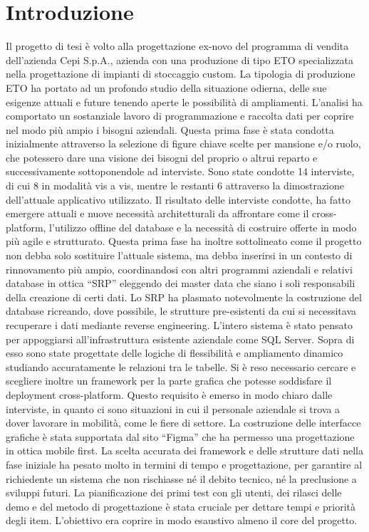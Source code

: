 \chapter{Introduzione}\label{chapter:introduction}
Il progetto di tesi è volto alla progettazione ex-novo del programma di vendita dell'azienda Cepi S.p.A.,
azienda con una produzione di tipo \ac{ETO} specializzata nella progettazione di impianti di stoccaggio custom.
La tipologia di produzione \ac{ETO} ha portato ad un profondo studio della situazione odierna, delle sue esigenze attuali
e future tenendo aperte le possibilità di ampliamenti.
L'analisi ha comportato un sostanziale lavoro di programmazione e raccolta dati per coprire nel modo più
ampio i bisogni aziendali.
Questa prima fase è stata condotta inizialmente attraverso la selezione di figure chiave scelte per mansione e/o ruolo,
che potessero
dare una visione dei bisogni del proprio o altrui reparto e successivamente sottoponendole ad interviste.
Sono state condotte 14 interviste, di cui 8 in modalità vis a vis, mentre le restanti 6 attraverso la dimostrazione
dell'attuale applicativo utilizzato.
Il risultato delle interviste condotte, ha fatto emergere attuali e nuove necessità architetturali da affrontare
come il cross-platform, l'utilizzo offline del database e la necessità di costruire offerte in modo più agile e strutturato.
Questa prima fase ha inoltre sottolineato come il progetto non debba solo sostituire l'attuale sistema,
ma debba inserirsi in un contesto di rinnovamento più ampio, coordinandosi con altri programmi aziendali e relativi database in ottica ``\ac{SRP}''
eleggendo dei master data che siano i soli responsabili della creazione di certi dati.
Lo \ac{SRP} ha plasmato notevolmente la costruzione del database ricreando, dove possibile,
le strutture pre-esistenti da cui si necessitava recuperare i dati mediante reverse engineering.
L'intero sistema è stato pensato per appoggiarsi all'infrastruttura esistente aziendale come SQL Server\cite{SQLServer}.
Sopra di esso sono state progettate delle logiche di flessibilità e ampliamento dinamico studiando accuratamente le relazioni tra le tabelle.
Si è reso necessario cercare e scegliere inoltre un framework per la parte grafica che potesse
soddisfare il deployment cross-platform. Questo requisito è emerso in modo chiaro dalle interviste,
in quanto ci sono situazioni
in cui il personale aziendale si trova a dover lavorare in mobilità, come le fiere di settore.
La costruzione delle interfacce grafiche è stata supportata dal sito ``Figma''\cite{Figma}
che ha permesso una progettazione %
in ottica mobile first.
La scelta accurata dei framework e delle strutture dati nella fase iniziale
ha pesato molto in termini di tempo e progettazione,
per garantire al richiedente un sistema che non rischiasse né il debito tecnico,
né la preclusione a sviluppi futuri.
La pianificazione dei primi test con gli utenti, dei rilasci delle demo e del metodo di progettazione è
stata cruciale per dettare tempi e priorità degli item. 
L'obiettivo era coprire in modo esaustivo almeno il core del progetto.

